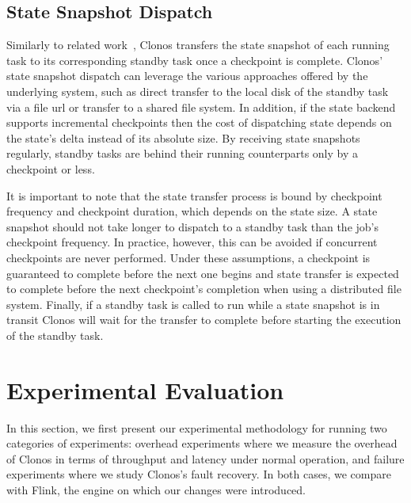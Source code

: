 \documentclass[sigconf]{acmart}
\begin{document}
\subsection{State Snapshot Dispatch}

Similarly to related work~\cite{Hwang2005HAA, KwonB08}, Clonos transfers the state snapshot of each running task to its corresponding standby task once a checkpoint is complete.
Clonos' state snapshot dispatch can leverage the various approaches offered by the underlying system, such as direct transfer to the local disk of the standby task via a file url or transfer to a shared file system.
In addition, if the state backend supports incremental checkpoints then the cost of dispatching state depends on the state's delta instead of its absolute size.
By receiving state snapshots regularly, standby tasks are behind their running counterparts only by a checkpoint or less.

It is important to note that the state transfer process is bound by checkpoint frequency and checkpoint duration, which depends  on the state size.
A state snapshot should not take longer to dispatch to a standby task than the job's checkpoint frequency. 
In practice, however, this can be avoided if concurrent checkpoints are never performed.
Under these assumptions, a checkpoint is guaranteed to complete before the next one begins and state transfer is expected to complete before the next checkpoint's completion when using a distributed file system. 
Finally, if a standby task is called to run while a state snapshot is in transit Clonos will wait for the transfer to complete before starting the execution of the standby task.



\section{Experimental Evaluation}
\label{sec:experiments}

In this section, we first present our experimental methodology for running two categories of experiments: overhead experiments where we measure the overhead of Clonos in terms of throughput and latency under normal operation, and failure experiments where we study Clonos's fault recovery. In both cases, we compare with Flink, the engine on which our changes were introduced.%

\end{document}
